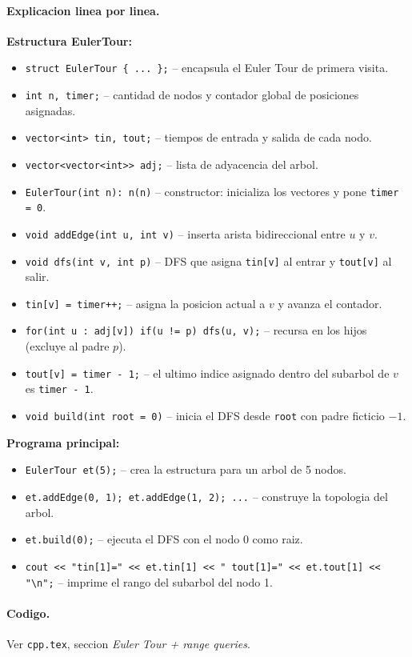 \paragraph{Explicacion linea por linea.}
\textbf{Estructura EulerTour:}
\begin{itemize}\setlength\itemsep{0pt}
	\item \verb|struct EulerTour { ... };| -- encapsula el Euler Tour de primera visita.
	\item \verb|int n, timer;| -- cantidad de nodos y contador global de posiciones asignadas.
	\item \verb|vector<int> tin, tout;| -- tiempos de entrada y salida de cada nodo.
	\item \verb|vector<vector<int>> adj;| -- lista de adyacencia del arbol.
	\item \verb|EulerTour(int n): n(n)| -- constructor: inicializa los vectores y pone \verb|timer = 0|.
	\item \verb|void addEdge(int u, int v)| -- inserta arista bidireccional entre $u$ y $v$.
	\item \verb|void dfs(int v, int p)| -- DFS que asigna \verb|tin[v]| al entrar y \verb|tout[v]| al salir.
	\item \verb|tin[v] = timer++;| -- asigna la posicion actual a $v$ y avanza el contador.
	\item \verb|for(int u : adj[v]) if(u != p) dfs(u, v);| -- recursa en los hijos (excluye al padre $p$).
	\item \verb|tout[v] = timer - 1;| -- el ultimo indice asignado dentro del subarbol de $v$ es \verb|timer - 1|.
	\item \verb|void build(int root = 0)| -- inicia el DFS desde \verb|root| con padre ficticio $-1$.
\end{itemize}
\textbf{Programa principal:}
\begin{itemize}\setlength\itemsep{0pt}
	\item \verb|EulerTour et(5);| -- crea la estructura para un arbol de 5 nodos.
	\item \verb|et.addEdge(0, 1); et.addEdge(1, 2); ...| -- construye la topologia del arbol.
	\item \verb|et.build(0);| -- ejecuta el DFS con el nodo 0 como raiz.
	\item \verb|cout << "tin[1]=" << et.tin[1] << " tout[1]=" << et.tout[1] << "\n";| -- imprime el rango del subarbol del nodo 1.
\end{itemize}

\paragraph{Codigo.}
Ver \texttt{cpp.tex}, seccion \textit{Euler Tour + range queries}.

\vspace{0.5em}

